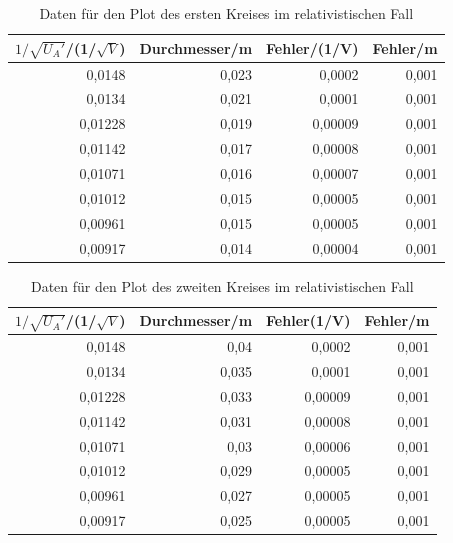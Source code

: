 \documentclass[12pt,a4paper]{article}
\begin{document}
\begin{table}[H]
\caption{Daten für den Plot des ersten Kreises im relativistischen Fall}
\begin{center}
\begin{tabular}{|r|r|r|r|}
\hline
\multicolumn{1}{|l|}{$1/\sqrt{U_A'}$/(1/$\sqrt{V}$)} & \multicolumn{1}{l|}{Durchmesser/m} & \multicolumn{1}{l|}{Fehler/(1/V)} & \multicolumn{1}{l|}{Fehler/m} \\ \hline
0,0148 & 0,023 & 0,0002 & 0,001 \\ \hline
0,0134 & 0,021 & 0,0001 & 0,001 \\ \hline
0,01228 & 0,019 & 0,00009 & 0,001 \\ \hline
0,01142 & 0,017 & 0,00008 & 0,001 \\ \hline
0,01071 & 0,016 & 0,00007 & 0,001 \\ \hline
0,01012 & 0,015 & 0,00005 & 0,001 \\ \hline
0,00961 & 0,015 & 0,00005 & 0,001 \\ \hline
0,00917 & 0,014 & 0,00004 & 0,001 \\ \hline
\end{tabular}
\end{center}
\label{tab:p_1_r}
\end{table}

\begin{table}[H]
\caption{Daten für den Plot des zweiten Kreises im relativistischen Fall}
\begin{center}
\begin{tabular}{|r|r|r|r|}
\hline
\multicolumn{1}{|l|}{$1/\sqrt{U_A'}$/(1/$\sqrt{V}$)} & \multicolumn{1}{l|}{Durchmesser/m} & \multicolumn{1}{l|}{Fehler(1/V)} & \multicolumn{1}{l|}{Fehler/m} \\ \hline
0,0148 & 0,04 & 0,0002 & 0,001 \\ \hline
0,0134 & 0,035 & 0,0001 & 0,001 \\ \hline
0,01228 & 0,033 & 0,00009 & 0,001 \\ \hline
0,01142 & 0,031 & 0,00008 & 0,001 \\ \hline
0,01071 & 0,03 & 0,00006 & 0,001 \\ \hline
0,01012 & 0,029 & 0,00005 & 0,001 \\ \hline
0,00961 & 0,027 & 0,00005 & 0,001 \\ \hline
0,00917 & 0,025 & 0,00005 & 0,001 \\ \hline
\end{tabular}
\end{center}
\label{tab:p_2_r}
\end{table}
\newpage
\end{document}

